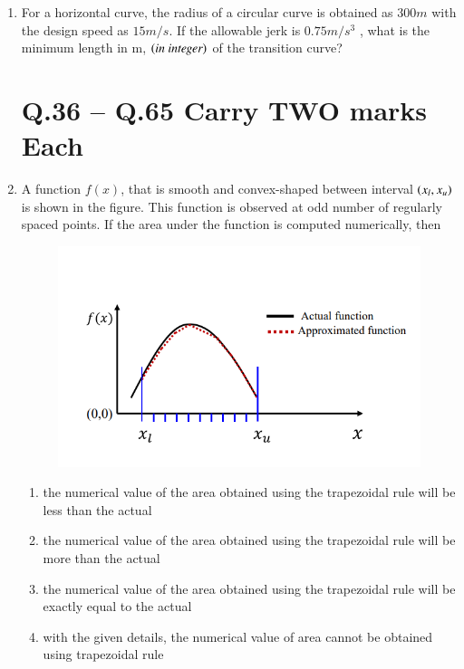 \documentclass[journal,12pt,onecolumn]{IEEEtran}
\theoremstyle{remark}
\begin{document}
\begin{enumerate}
\hfill{}

\item For a horizontal curve, the radius of a circular curve is obtained as $300 m$ with the design speed as $15 m/s$. If the allowable jerk is $0.75 m/s^3$ , what is the minimum length in m, $\left(\textit{in integer}\right)$ of the transition curve? \underline{\hspace{3cm}}

\hfill{}

\section*{Q.36 – Q.65 Carry TWO marks Each}

\item A function $f(x)$, that is smooth and convex-shaped between interval $\left(x_l,x_u\right)$ is shown in the figure. This function is observed at odd number of regularly spaced points. If the area under the function is computed numerically, then \underline{\hspace{2cm}}

\hfill{}
\begin{figure}[H]
\centering
\includegraphics[width=0.5\linewidth]{figs/q36.png}
\caption*{}
\label{fig:Q.36}
\end{figure}

\begin{enumerate}
\item the numerical value of the area obtained using the trapezoidal rule will be less than the actual
\item the numerical value of the area obtained using the trapezoidal rule will be more than the actual
\item the numerical value of the area obtained using the trapezoidal rule will be exactly equal to the actual
\item with the given details, the numerical value of area cannot be obtained using trapezoidal rule
\end{enumerate}


\end{enumerate}
\end{document}
